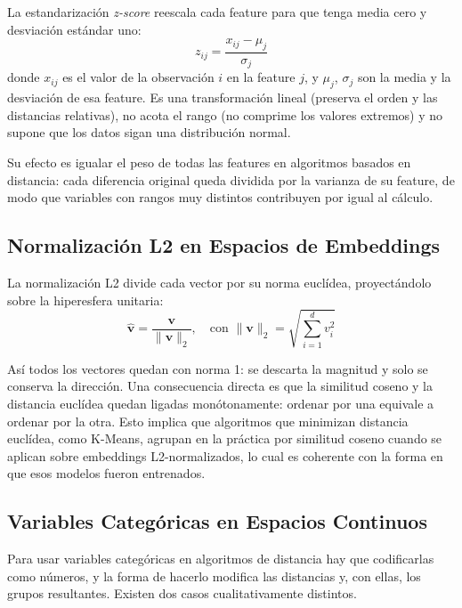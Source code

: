 La estandarización \textit{z-score} reescala cada feature para que tenga media cero y desviación estándar uno:
\begin{equation}
    z_{ij} = \frac{x_{ij} - \mu_j}{\sigma_j}
    \label{eq:zscore-teo}
\end{equation}
\noindent donde $x_{ij}$ es el valor de la observación $i$ en la feature $j$, y $\mu_j$, $\sigma_j$ son la media y la desviación de esa feature. Es una transformación lineal (preserva el orden y las distancias relativas), no acota el rango (no comprime los valores extremos) y no supone que los datos sigan una distribución normal.

Su efecto es igualar el peso de todas las features en algoritmos basados en distancia: cada diferencia original queda dividida por la varianza de su feature, de modo que variables con rangos muy distintos contribuyen por igual al cálculo.

\subsection{Normalización L2 en Espacios de Embeddings}
\label{subsec:l2-teoria}

La normalización L2 divide cada vector por su norma euclídea, proyectándolo sobre la hiperesfera unitaria:
\begin{equation}
    \hat{\mathbf{v}} = \frac{\mathbf{v}}{\|\mathbf{v}\|_2}, \quad \text{con } \|\mathbf{v}\|_2 = \sqrt{\sum_{i=1}^{d} v_i^2}
    \label{eq:l2-teo}
\end{equation}

Así todos los vectores quedan con norma 1: se descarta la magnitud y solo se conserva la dirección. Una consecuencia directa es que la similitud coseno y la distancia euclídea quedan ligadas monótonamente: ordenar por una equivale a ordenar por la otra. Esto implica que algoritmos que minimizan distancia euclídea, como K-Means, agrupan en la práctica por similitud coseno cuando se aplican sobre embeddings L2-normalizados, lo cual es coherente con la forma en que esos modelos fueron entrenados.

\subsection{Variables Categóricas en Espacios Continuos}
\label{subsec:categoricas-continuas}

Para usar variables categóricas en algoritmos de distancia hay que codificarlas como números, y la forma de hacerlo modifica las distancias y, con ellas, los grupos resultantes. Existen dos casos cualitativamente distintos.

